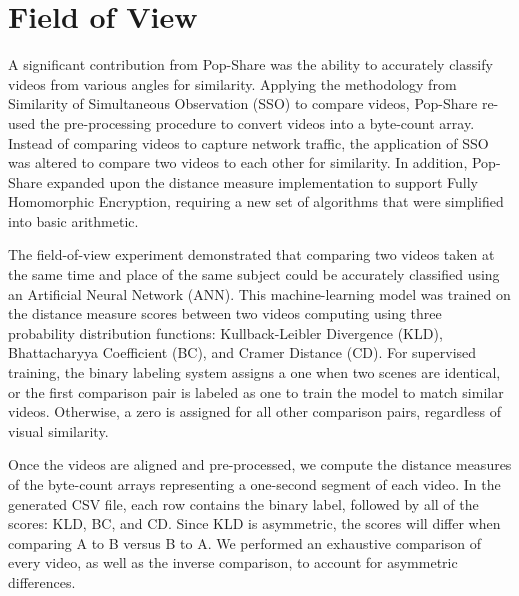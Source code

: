 \section{Field of View}
\label{sec:Field of View}


A significant contribution from Pop-Share \cite{Lagesse2021-PopShare} was the ability to accurately classify videos from various angles for similarity. Applying the methodology from Similarity of Simultaneous Observation (SSO) \cite{Wu2019-SSO} to compare videos, Pop-Share re-used the pre-processing procedure to convert videos into a byte-count array. Instead of comparing videos to capture network traffic, the application of SSO was altered to compare two videos to each other for similarity. In addition, Pop-Share expanded upon the distance measure implementation to support Fully Homomorphic Encryption, requiring a new set of algorithms that were simplified into basic arithmetic. 


The field-of-view experiment demonstrated that comparing two videos taken at the same time and place of the same subject could be accurately classified using an Artificial Neural Network (ANN). This machine-learning model was trained on the distance measure scores between two videos computing using three probability distribution functions: Kullback-Leibler Divergence (KLD), Bhattacharyya Coefficient (BC), and Cramer Distance (CD). For supervised training, the binary labeling system assigns a one when two scenes are identical, or the first comparison pair is labeled as one to train the model to match similar videos. Otherwise, a zero is assigned for all other comparison pairs, regardless of visual similarity.

Once the videos are aligned and pre-processed, we compute the distance measures of the byte-count arrays representing a one-second segment of each video. In the generated CSV file, each row contains the binary label, followed by all of the scores: KLD, BC, and CD. Since KLD is asymmetric, the scores will differ when comparing A to B versus B to A. We performed an exhaustive comparison of every video, as well as the inverse comparison, to account for asymmetric differences.



